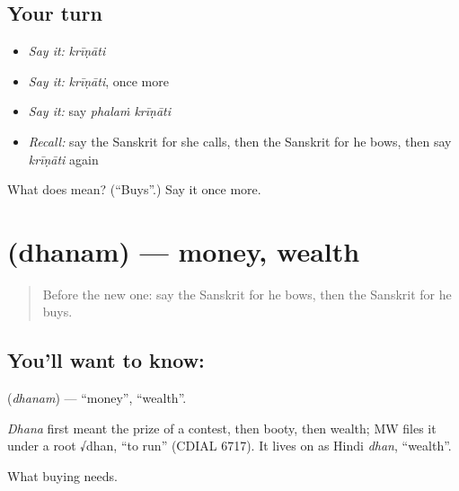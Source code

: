 \subsection*{Your turn}
\begin{itemize}
\raggedright
  \item \emph{Say it:} \emph{krīṇāti}
  \item \emph{Say it:} \emph{krīṇāti}, once more
  \item \emph{Say it:} say \emph{phalaṁ krīṇāti}
  \item \emph{Recall:} say the Sanskrit for she calls, then the Sanskrit for he bows, then say \emph{krīṇāti} again
\end{itemize}

\begin{tcolorbox}[breakable,colback=teal!4,colframe=teal!35!black,title={Before you move on}]
What does  mean? (\textquotedblleft{}Buys\textquotedblright{}.) Say it once more.
\end{tcolorbox}
\section[\texorpdfstring{\sk{धनम्} (dhanam)}{धनम् (dhanam)}]{ (dhanam) — money, wealth}

\label{lesson:SA-C74-money}



\begin{quote}
Before the new one: say the Sanskrit for he bows, then the Sanskrit for he buys.
\end{quote}

\subsection*{You'll want to know: }
\textbf{} (\emph{dhanam}) — \textquotedblleft{}money\textquotedblright{}, \textquotedblleft{}wealth\textquotedblright{}.

\begin{cousinweb}
\emph{Dhana} first meant the prize of a contest, then booty, then wealth; MW files it under a root √dhan, \textquotedblleft{}to run\textquotedblright{} (CDIAL 6717). It lives on as Hindi \emph{dhan}, \textquotedblleft{}wealth\textquotedblright{}.
\end{cousinweb}

\begin{grammarlens}[title={What you've built}]
What buying needs.
\end{grammarlens}

